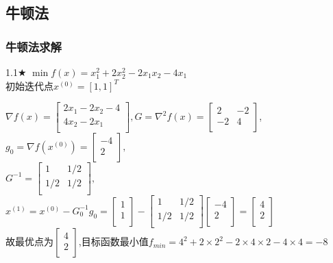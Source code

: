 \subsection{牛顿法}

\subsubsection{牛顿法求解}

\begin{problem}{1.1$\bigstar$}
    $\min f(x)=x_1^2+2x_2^2-2x_1x_2-4x_1$\\
    初始迭代点${x^{(0)}}=[1,1]^T$
\end{problem}
\begin{solution}
    $\nabla f(x)=\begin{bmatrix}
        2x_1-2x_2-4  \\
        4x_2-2x_1  \\
    \end{bmatrix}, G=\nabla^2 f(x)=\begin{bmatrix}
        2   & -2  \\
        -2  & 4  \\
    \end{bmatrix}$,\\
    $g_0=\nabla f(x^{(0)})=\begin{bmatrix} -4\\2\\\end{bmatrix},$\\
    $G^{-1}=\begin{bmatrix}
        1   & 1/2\\
        1/2 & 1/2\\
    \end{bmatrix},$\\
    $x^{(1)}=x^{(0)}-G_0^{-1}g_0=\begin{bmatrix} 1\\1\\\end{bmatrix}-\begin{bmatrix}
        1   & 1/2\\
        1/2 & 1/2\\
    \end{bmatrix}\begin{bmatrix} -4\\2\\\end{bmatrix}=\begin{bmatrix} 4\\2\\\end{bmatrix}$\\
    故最优点为$\begin{bmatrix} 4\\2\\\end{bmatrix}$,目标函数最小值$f_{min}=4^2+2\times2^2-2\times4\times2-4\times4=-8$
\end{solution}

